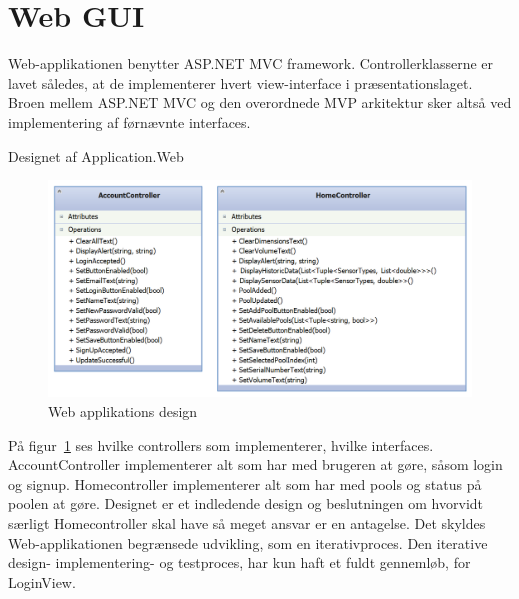 \section{Web GUI}
Web-applikationen benytter ASP.NET MVC framework. Controllerklasserne er lavet således, at de implementerer hvert view-interface i præsentationslaget. Broen mellem ASP.NET MVC og den overordnede MVP arkitektur sker altså ved implementering af førnævnte interfaces.

Designet af Application.Web
\begin{figure}
	\centering
	\includegraphics[width=0.9\linewidth]{figs/design/application_web}
	\caption{Web applikations design}
	\label{fig:web_class}
\end{figure}

På figur~\ref{fig:web_class} ses hvilke controllers som implementerer, hvilke interfaces. AccountController implementerer alt som har med brugeren at gøre, såsom login og signup. Homecontroller implementerer alt som har med pools og status på poolen at gøre. Designet er et indledende design og beslutningen om hvorvidt særligt Homecontroller skal have så meget ansvar er en antagelse. Det skyldes Web-applikationen begrænsede udvikling, som en iterativproces. Den iterative design- implementering- og testproces, har kun haft et fuldt gennemløb, for LoginView. 

